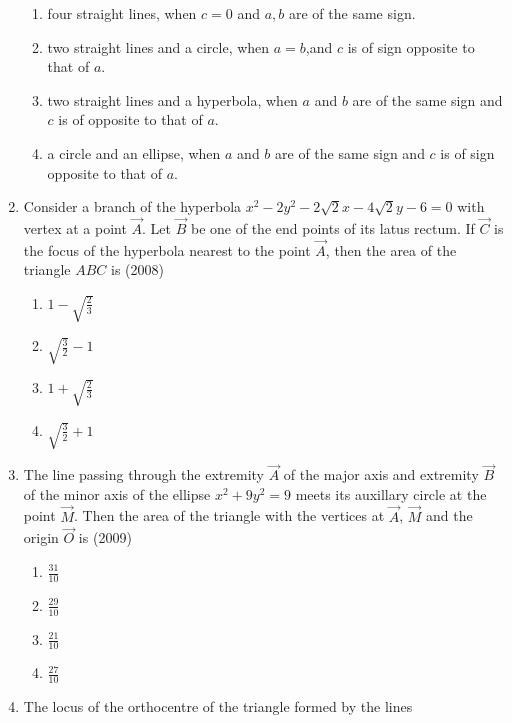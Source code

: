 \begin{enumerate}[label=\thesubsection.\arabic*.,ref=\thesubsection.\theenumi]
\begin{enumerate}
    \item four straight lines, when $c=0$ and $a, b$ are of the same sign.
    \item two straight lines and a circle, when $a=b$,and $c$ is of sign opposite to that of $a$.
    \item two straight lines and a hyperbola, when $a$ and $b$ are of the same sign and $c$ is of opposite to that of $a$.
    \item a circle and an ellipse, when $a$ and $b$ are of the same sign and $c$ is of sign opposite to that of $a$.
\end{enumerate}
\item Consider a branch of the hyperbola $x^{2}-2y^{2}-2\sqrt{2}x-4\sqrt{2}y-6=0$ with vertex at a point  $\vec{A}$. Let  $\vec{B}$  be one of the end points of its latus rectum. If $\vec{C}$ is the focus of the hyperbola nearest to the point  $\vec{A}$, then the area of the triangle $ABC$ is \hfill{(2008)}
\begin{multicols}{4}
\begin{enumerate}
    \item $1-\sqrt{\frac{2}{3}}$
    \item $\sqrt{\frac{3}{2}}-1$
    \item $1+\sqrt{\frac{2}{3}}$
    \item $\sqrt{\frac{3}{2}}+1$
\end{enumerate}
\end{multicols}
\item The line passing through the extremity $\vec{A}$ of the major axis and extremity $\vec{B}$ of the minor axis of the ellipse $x^{2}+9y^{2}=9$ meets its auxillary circle at the point $\vec{M}$. Then the area of the triangle with the vertices at $\vec{A}$, $\vec{M}$ and the origin $\vec{O}$ is \hfill{(2009)}
\begin{multicols}{4}
\begin{enumerate}
    \item $\frac{31}{10}$
    \item $\frac{29}{10}$
    \item $\frac{21}{10}$
    \item $\frac{27}{10}$
\end{enumerate}\end{multicols}
\item The locus of the orthocentre of the triangle formed by the lines
		

\end{enumerate}

